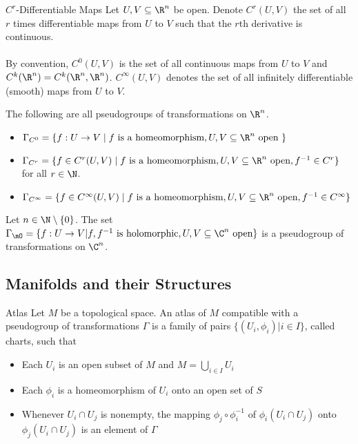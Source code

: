 \documentclass[a4paper]{article}
\begin{document}
\begin{defn}{$C^r$-Differentiable Maps}{} Let $U,V\subseteq\R^n$ be open. Denote $C^r(U,V)$ the set of all $r$ times differentiable maps from $U$ to $V$ such that the $r$th derivative is continuous. \\~\\
By convention, $C^0(U,V)$ is the set of all continuous maps from $U$ to $V$ and $C^k(\R^n)=C^k(\R^n,\R^n)$. $C^\infty(U,V)$ denotes the set of all infinitely differentiable (smooth) maps from $U$ to $V$. 
\end{defn}

\begin{prp}{}{} The following are all pseudogroups of transformations on $\R^n$. 
\begin{itemize}
\item $\Gamma_{C^0}=\{f:U\to V\;|\;f\text{ is a homeomorphism}, U,V\subseteq\R^n\text{ open }\}$
\item $\Gamma_{C^r}=\{f\in C^r(U,V)\;|\;f\text{ is a homeomorphism}, U,V\subseteq\R^n\text{ open}, f^{-1}\in C^r\}$ for all $r\in\N$. 
\item $\Gamma_{C^\infty}=\{f\in C^\infty(U,V)\;|\;f\text{ is a homeomorphism}, U,V\subseteq\R^n\text{ open},f^{-1}\in C^\infty\}$
\end{itemize}
\end{prp}

\begin{prp}{}{} Let $n\in\N\setminus\{0\}$. The set $\Gamma_{\mO}=\{f:U\to V|f,f^{-1}\text{ is holomorphic}, U,V\subseteq\C^n\text{ open}\}$ is a pseudogroup of transformations on $\C^n$. 
\end{prp}

\subsection{Manifolds and their Structures}
\begin{defn}{Atlas}{} Let $M$ be a topological space. An atlas of $M$ compatible with a pseudogroup of transformations $\Gamma$ is a family of pairs $\{(U_i,\phi_i)|i\in I\}$, called charts, such that 
\begin{itemize}
\item Each $U_i$ is an open subset of $M$ and $M=\bigcup_{i\in I}U_i$
\item Each $\phi_i$ is a homeomorphism of $U_i$ onto an open set of $S$
\item Whenever $U_i\cap U_j$ is nonempty, the mapping $\phi_j\circ\phi_i^{-1}$ of $\phi_i(U_i\cap U_j)$ onto $\phi_j(U_i\cap U_j)$ is an element of $\Gamma$
\end{itemize}
\end{defn}
\end{document}
